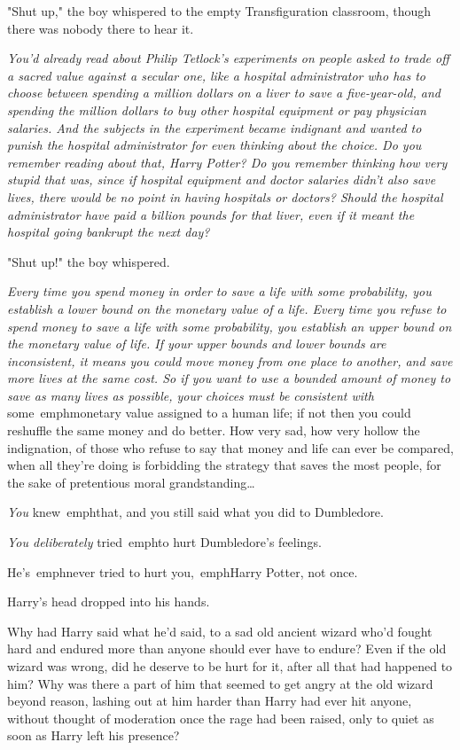 "Shut up," the boy whispered to the empty Transfiguration classroom, though 
there was nobody there to hear it.

\emph{You'd already read about Philip Tetlock's experiments on people asked to 
trade off a sacred value against a secular one, like a hospital administrator 
who has to choose between spending a million dollars on a liver to save a 
five-year-old, and spending the million dollars to buy other hospital equipment 
or pay physician salaries. And the subjects in the experiment became indignant 
and wanted to punish the hospital administrator for even thinking about the 
choice. Do you remember reading about that, Harry Potter? Do you remember 
thinking how very stupid that was, since if hospital equipment and doctor 
salaries didn't also save lives, there would be no point in having hospitals or 
doctors? Should the hospital administrator have paid a billion pounds for that 
liver, even if it meant the hospital going bankrupt the next day?}

"Shut up!" the boy whispered.

\emph{Every time you spend money in order to save a life with some probability, 
you establish a lower bound on the monetary value of a life. Every time you 
refuse to spend money to save a life with some probability, you establish an 
upper bound on the monetary value of life. If your upper bounds and lower 
bounds are inconsistent, it means you could move money from one place to 
another, and save more lives at the same cost. So if you want to use a bounded 
amount of money to save as many lives as possible, your choices must be 
consistent with} some\ emph{monetary value assigned to a human life; if not 
then you could reshuffle the same money and do better. How very sad, how very 
hollow the indignation, of those who refuse to say that money and life can ever 
be compared, when all they're doing is forbidding the strategy that saves the 
most people, for the sake of pretentious moral grandstanding{\ldots}}

\emph{You} knew\ emph{that, and you still said what you did to Dumbledore.}

\emph{You deliberately} tried\ emph{to hurt Dumbledore's feelings.}

He's\ emph{never tried to hurt} you,\ emph{Harry Potter, not once.} 

Harry's head dropped into his hands.

Why had Harry said what he'd said, to a sad old ancient wizard who'd fought 
hard and endured more than anyone should ever have to endure? Even if the old 
wizard was wrong, did he deserve to be hurt for it, after all that had happened 
to him? Why was there a part of him that seemed to get angry at the old wizard 
beyond reason, lashing out at him harder than Harry had ever hit anyone, 
without thought of moderation once the rage had been raised, only to quiet as 
soon as Harry left his presence?

